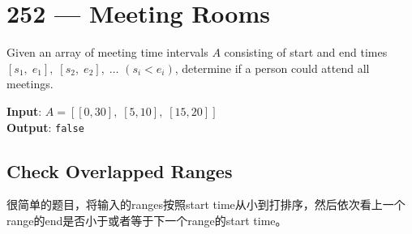 \section{252 --- Meeting Rooms}
Given an array of meeting time intervals $A$ consisting of start and end times $[s_1,\;e_1],\;[s_2,\;e_2],\;\ldots$ $(s_i < e_i)$, determine if a person could attend all meetings.
\par
\begin{flushleft}
\textbf{Input}: $A =[[0, 30],\;[5, 10],\;[15, 20]]$
\\
\textbf{Output}: \texttt{false}
\end{flushleft}
\subsection{Check Overlapped Ranges}
很简单的题目，将输入的ranges按照start time从小到打排序，然后依次看上一个range的end是否小于或者等于下一个range的start time。